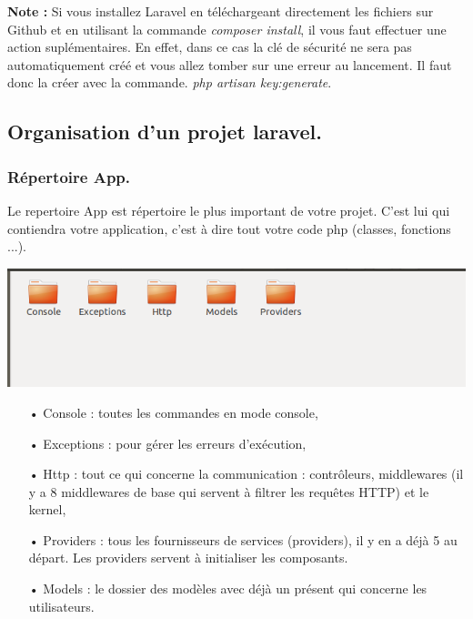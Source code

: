 \documentclass[12pt,a4paper]{article}
\begin{document}
\textbf{Note :} Si vous installez Laravel en téléchargeant directement les fichiers sur Github et en utilisant la commande \textit{composer install}, il vous faut effectuer une action suplémentaires. En effet, dans ce cas la clé de sécurité ne sera pas automatiquement créé et vous allez tomber sur une erreur au lancement. Il faut donc la créer avec la commande.
\textit{php artisan key:generate}.

\subsection{Organisation d'un projet laravel.}
\subsubsection{Répertoire App.}
Le repertoire App est répertoire le plus important de votre projet. C'est lui qui contiendra
votre application, c'est à dire tout votre code php (classes, fonctions ...).

\begin{center}
\includegraphics[scale=0.7]{img/gapp.png}
\end{center}

\begin{itemize}
\item[•] Console : toutes les commandes en mode console,
\item[•] Exceptions : pour gérer les erreurs d'exécution,
\item[•] Http : tout ce qui concerne la communication : contrôleurs, middlewares (il y a 8 middlewares
de base qui servent à filtrer les requêtes HTTP) et le kernel,
\item[•] Providers : tous les fournisseurs de services (providers), il y en a déjà 5 au départ. Les providers
servent à initialiser les composants.
\item[•] Models : le dossier des modèles avec déjà un présent qui concerne les utilisateurs.
\end{itemize}
\end{document}
